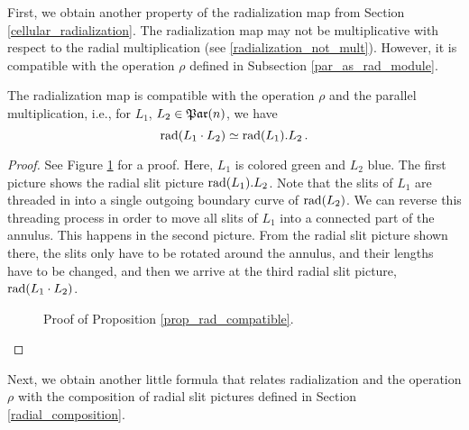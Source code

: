First, we obtain another property of the radialization map from Section \ref{cellular_radialization}.
The radialization map may not be multiplicative with respect to the radial multiplication (see \ref{radialization_not_mult}).
However, it is compatible with the operation $\rho$ defined in Subsection \ref{par_as_rad_module}.

\begin{prop}
\label{prop_rad_compatible}
   The radialization map is compatible with the operation $\rho$ and the parallel multiplication, i.e., for $L_1$, $L_2 \in \mathfrak{Par}(n)$, we have
   \[
      \operatorname{rad}(L_1 \cdot L_2) \simeq \operatorname{rad}(L_1).L_2\,. 
   \]
\begin{proof}
  See Figure \ref{rad_compatible} for a proof.
  Here, $L_1$ is colored green and $L_2$ blue.
  The first picture shows the radial slit picture $\operatorname{rad}(L_1).L_2$.
  Note that the slits of $L_1$ are threaded in into a single outgoing boundary curve of $\operatorname{rad}(L_2)$.
  We can reverse this threading process in order to move all slits of $L_1$ into a connected part of the annulus.
  This happens in the second picture.
  From the radial slit picture shown there, the slits only have to be rotated around the annulus, and their lengths have to be changed,
  and then we arrive at the third radial slit picture, $\operatorname{rad}(L_1 \cdot L_2)$.  
  \begin{figure}[ht]
  \centering
  \caption{\label{rad_compatible} Proof of Proposition \ref{prop_rad_compatible}.}
  \end{figure}
   
\end{proof}
\end{prop}

Next, we obtain another little formula that relates radialization and the operation $\rho$ with the composition of radial slit pictures defined in Section \ref{radial_composition}.

